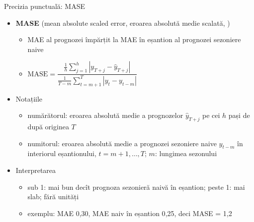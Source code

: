 \begin{frame}{Precizia punctuală: MASE}
\itemsize{\footnotesize}
\begin{itemize}
    \item \textbf{MASE} (mean absolute scaled error, eroarea absolută medie scalată, )
    \begin{itemize}
        \item MAE al prognozei împărțit la MAE în eșantion al prognozei sezoniere naive
        \item $\text{MASE} = \dfrac{\frac1h\sum_{j=1}^{h}|y_{T+j} - \hat y_{T+j}|}{\frac{1}{T-m}\sum_{t=m+1}^{T}|y_t - y_{t-m}|}$
    \end{itemize}
    \item Notațiile
    \begin{itemize}
        \item numărătorul: eroarea absolută medie a prognozelor $\hat y_{T+j}$ pe cei $h$ pași de după originea $T$
        \item numitorul: eroarea absolută medie a prognozei sezoniere naive $y_{t-m}$ în interiorul eșantionului, $t = m+1, \dots, T$; $m$: lungimea sezonului
    \end{itemize}
    \item Interpretarea
    \begin{itemize}
        \item sub 1: mai bun decît prognoza sezonieră naivă în eșantion; peste 1: mai slab; fără unități
        \item exemplu: MAE 0{,}30, MAE naiv în eșantion 0{,}25, deci MASE = 1{,}2
    \end{itemize}
\end{itemize}
\end{frame}

